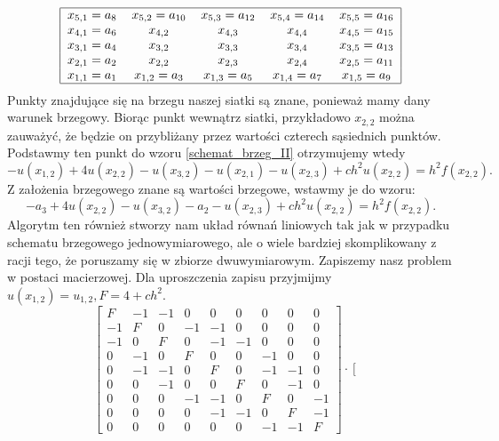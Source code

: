 \documentclass[12pt,a4paper]{report}
\begin{document}
\begin{problem}
\begin{example}
\begin{align*}
\begin{tabular}{|ccccc|}
\hline
$ x_{5,1}=a_8$ & $x_{5,2}=a_{10}$ & $x_{5,3}=a_{12}$ & $x_{5,4}=a_{14}$ &$ x_{5,5}=a_{16}$ \\
$x_{4,1} = a_6$ &$ x_{4,2}$ & $x_{4,3}$ & $x_{4,4}$ & $x_{4,5} = a_{15}$ \\
$x_{3,1} = a_4$ & $x_{3,2}$ & $x_{3,3}$ & $x_{3,4}$ & $x_{3,5} = a_{13}$ \\
$x_{2,1} = a_2$ & $x_{2,2}$ & $x_{2,3}$ & $x_{2,4}$ & $x_{2,5} = a_{11}$ \\
$x_{1,1} = a_1$ &$x_{1,2}=a_3$ & $x_{1,3}=a_5$ & $x_{1,4}=a_7$ & $x_{1,5} = a_{9}$ \\
\hline
\end{tabular}
\end{align*}
Punkty znajdujące się na brzegu naszej siatki są znane, ponieważ mamy dany warunek brzegowy. Biorąc punkt wewnątrz siatki, przykładowo $x_{2,2}$ można zauważyć, że będzie on przybliżany przez wartości czterech sąsiednich punktów. Podstawmy ten punkt do wzoru \eqref{schemat_brzeg_II} otrzymujemy wtedy
$$
-u(x_{1,2}) + 4u(x_{2,2}) - u(x_{3,2}) - u(x_{2,1}) - u(x_{2,3}) + ch^2u(x_{2,2}) = h^2f(x_{2,2}).
$$
Z założenia brzegowego znane są wartości brzegowe, wstawmy je do wzoru:
$$
-a_3 + 4u(x_{2,2}) - u(x_{3,2}) - a_2 - u(x_{2,3}) + ch^2u(x_{2,2}) = h^2f(x_{2,2}).
$$
Algorytm ten również stworzy nam układ równań liniowych tak jak w przypadku schematu brzegowego jednowymiarowego, ale o wiele bardziej skomplikowany z racji tego, że poruszamy się w zbiorze dwuwymiarowym. Zapiszemy nasz problem w postaci macierzowej. Dla uproszczenia zapisu przyjmijmy $u(x_{1,2}) = u_{1,2}, F= 4+ch^2$.
$$
\left[ \begin{array}{ccccccccc}
F & -1 & -1 & 0 & 0 & 0& 0 & 0 & 0\\
-1 & F & 0 & -1 & -1 & 0 & 0 & 0 & 0 \\
-1 & 0 & F & 0 & -1 & -1& 0 & 0 & 0 \\
0 & -1 & 0 & F & 0& 0 & -1 & 0 & 0  \\ 
0 & -1 & -1& 0 & F & 0& -1 & -1 & 0 \\
0 & 0 & -1 & 0 & 0 & F & 0 & -1 & 0 \\
0 & 0 & 0 & -1 & -1 & 0 & F & 0 & -1 \\
0 & 0 & 0 & 0 & -1 & -1 & 0 & F & -1 \\
0 & 0 & 0 & 0 & 0 & 0 & -1 & -1 & F
\end{array} \right] \cdot
\left[ \begin{array}{c}

\end{array}$$
\end{example}
\end{problem}
\end{document}
